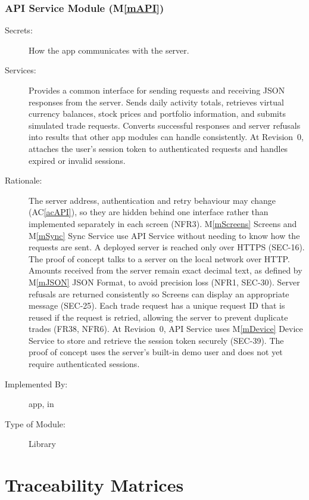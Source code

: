 \documentclass[12pt, titlepage]{article}
\newcommand{\acref}[1]{AC\ref{#1}}
\newcommand{\mref}[1]{M\ref{#1}}
\begin{document}
\subsubsection{API Service Module (\mref{mAPI})}

\begin{description}
\item[Secrets:] How the app communicates with the server.
\item[Services:] Provides a common interface for sending requests and receiving JSON responses from the \progname{} server. Sends daily activity totals, retrieves virtual currency balances, stock prices and portfolio information, and submits simulated trade requests. Converts successful responses and server refusals into results that other app modules can handle consistently. At Revision~0, attaches the user's session token to authenticated requests and handles expired or invalid sessions.
\item[Rationale:] The server address, authentication and retry behaviour may change (\acref{acAPI}), so they are hidden behind one interface rather than implemented separately in each screen (NFR3). \mref{mScreens} Screens and \mref{mSync} Sync Service use API Service without needing to know how the requests are sent. A deployed server is reached only over HTTPS (SEC-16). The proof of concept talks to a server on the local network over HTTP. Amounts received from the server remain exact decimal text, as defined by \mref{mJSON} JSON Format, to avoid precision loss (NFR1, SEC-30). Server refusals are returned consistently so Screens can display an appropriate message (SEC-25). Each trade request has a unique request ID that is reused if the request is retried, allowing the server to prevent duplicate trades (FR38, NFR6). At Revision~0, API Service uses \mref{mDevice} Device Service to store and retrieve the session token securely (SEC-39). The proof of concept uses the server's built-in demo user and does not yet require authenticated sessions.
\item[Implemented By:] \progname{} app, in 
\item[Type of Module:] Library
\end{description}



\newpage
\section{Traceability Matrices} \label{SecTM}
\end{document}

